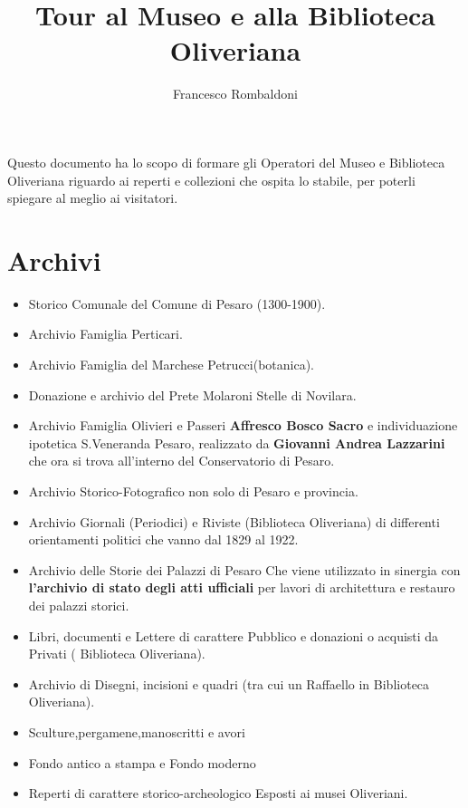 \documentclass[hidelinks,12pt,a4paper]{article}
\begin{document}
	\begin{flushleft}
		
		\title{\textbf{Tour al Museo e alla Biblioteca Oliveriana}}
		\author{Francesco Rombaldoni}
		\date{} 
		 
	  	\maketitle
	    
		\setcounter{page}{1}
		\newpage
		\vspace*{\fill}
			Questo documento ha lo scopo di formare gli Operatori del Museo e Biblioteca Oliveriana riguardo ai reperti e collezioni che ospita lo stabile, per poterli spiegare al meglio ai visitatori.
		\vspace*{\fill}
		\newpage
		\tableofcontents
		\newpage
	
		\section{Archivi}
				
		\begin{itemize}
			\item Storico Comunale del Comune di Pesaro (1300-1900).
			\item Archivio Famiglia Perticari.
			\item Archivio Famiglia del Marchese Petrucci(botanica).
			\item Donazione e archivio del Prete Molaroni \textrightarrow Stelle di Novilara.
			\item Archivio Famiglia Olivieri e Passeri \textrightarrow \textbf{Affresco Bosco Sacro} e individuazione ipotetica S.Veneranda Pesaro, realizzato da \textbf{Giovanni Andrea Lazzarini} che ora si trova all'interno del Conservatorio di Pesaro.
			\item Archivio Storico-Fotografico non solo di Pesaro e provincia.
			\item Archivio Giornali (Periodici) e Riviste (Biblioteca Oliveriana) di differenti orientamenti politici che vanno dal 1829 al 1922.
			\item Archivio delle Storie dei Palazzi di Pesaro \textrightarrow Che viene utilizzato in sinergia con \textbf{l'archivio di stato degli atti ufficiali} per lavori di architettura e restauro dei palazzi storici.
			\item Libri, documenti e Lettere di carattere Pubblico e donazioni o acquisti da Privati ( Biblioteca Oliveriana).
			\item Archivio di Disegni, incisioni e quadri (tra cui un Raffaello in Biblioteca Oliveriana).
		    \item Sculture,pergamene,manoscritti e avori
		    \item Fondo antico a stampa e Fondo moderno
	  	\item Reperti di carattere storico-archeologico \textrightarrow Esposti ai musei Oliveriani.			
		\end{itemize}
	

\end{flushleft}
\end{document}

